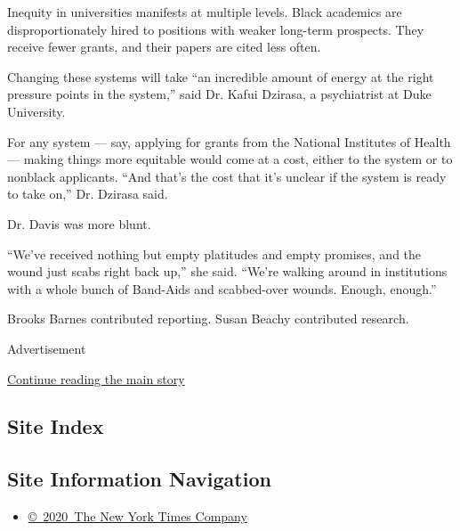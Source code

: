 Inequity in universities manifests at multiple levels. Black academics
are disproportionately hired to positions with weaker long-term
prospects. They receive fewer grants, and their papers are cited less
often.

Changing these systems will take ``an incredible amount of energy at the
right pressure points in the system,'' said Dr. Kafui Dzirasa, a
psychiatrist at Duke University.

For any system --- say, applying for grants from the National Institutes
of Health --- making things more equitable would come at a cost, either
to the system or to nonblack applicants. ``And that's the cost that it's
unclear if the system is ready to take on,'' Dr. Dzirasa said.

Dr. Davis was more blunt.

``We've received nothing but empty platitudes and empty promises, and
the wound just scabs right back up,'' she said. ``We're walking around
in institutions with a whole bunch of Band-Aids and scabbed-over wounds.
Enough, enough.''

Brooks Barnes contributed reporting. Susan Beachy contributed research.

Advertisement

\protect\hyperlink{after-bottom}{Continue reading the main story}

\hypertarget{site-index}{%
\subsection{Site Index}\label{site-index}}

\hypertarget{site-information-navigation}{%
\subsection{Site Information
Navigation}\label{site-information-navigation}}

\begin{itemize}
\tightlist
\item
  \href{https://help.nytimes3xbfgragh.onion/hc/en-us/articles/115014792127-Copyright-notice}{©~2020~The
  New York Times Company}
\end{itemize}

